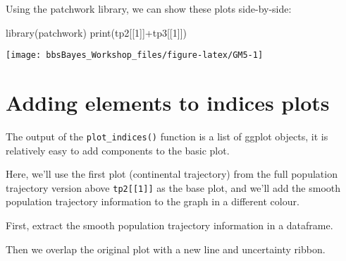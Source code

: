 \documentclass[
]{book}
\newenvironment{Shaded}{\begin{snugshade}}{\end{snugshade}}
\newcommand{\DecValTok}[1]{\textcolor[rgb]{0.00,0.00,0.81}{#1}}
\newcommand{\FunctionTok}[1]{\textcolor[rgb]{0.00,0.00,0.00}{#1}}
\newcommand{\NormalTok}[1]{#1}
\newcommand{\OtherTok}[1]{\textcolor[rgb]{0.56,0.35,0.01}{#1}}
\newcommand{\SpecialCharTok}[1]{\textcolor[rgb]{0.00,0.00,0.00}{#1}}
\newcommand{\StringTok}[1]{\textcolor[rgb]{0.31,0.60,0.02}{#1}}
\begin{document}
Using the patchwork library, we can show these plots side-by-side:

\begin{Shaded}
\begin{Highlighting}[]
\FunctionTok{library}\NormalTok{(patchwork)}
\FunctionTok{print}\NormalTok{(tp2[[}\DecValTok{1}\NormalTok{]]}\SpecialCharTok{+}\NormalTok{tp3[[}\DecValTok{1}\NormalTok{]])}
\end{Highlighting}
\end{Shaded}

\begin{center}\texttt{[image: bbsBayes\_Workshop\_files/figure-latex/GM5-1]} \end{center}

\hypertarget{adding-elements-to-indices-plots}{%
\section{Adding elements to indices plots}\label{adding-elements-to-indices-plots}}

The output of the \texttt{plot\_indices()} function is a list of ggplot objects, it is relatively easy to add components to the basic plot.

Here, we'll use the first plot (continental trajectory) from the full population trajectory version above \texttt{tp2{[}{[}1{]}{]}} as the base plot, and we'll add the smooth population trajectory information to the graph in a different colour.

First, extract the smooth population trajectory information in a dataframe.

\begin{Shaded}
\end{Shaded}

Then we overlap the original plot with a new line and uncertainty ribbon.
\end{document}
